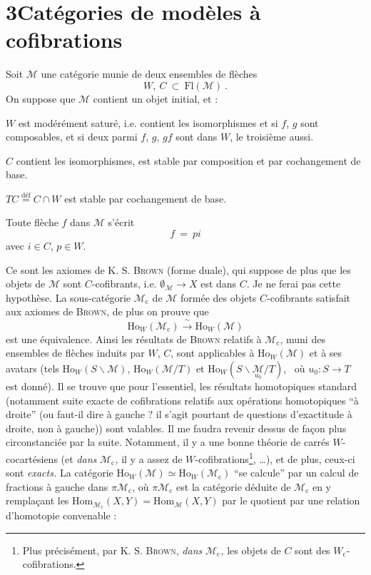 \documentclass[11pt]{article}
\newcommand{\printedpage}[1]{\marginpar{\footnotesize p.~#1\ifstrequal{#1}{1}{\\[2pt]{[page 1]}}{}}}
\newcommand{\msp}[1]{\ifstrequal{#1}{page 1}{}{\marginpar{\footnotesize [#1]}}}
\newcommand{\M}{\mathcal{M}}
\newcommand{\Mc}{\mathcal{M}_{\mathrm{c}}}
\begin{document}
\section*{3\quad Catégories de modèles à cofibrations}

Soit $\M$ une catégorie munie de deux ensembles de flèches
\[ W,\ C\ \subset\ \mathrm{Fl}(\M)\ . \]
On suppose que $\M$ contient un objet initial, et :
\begin{description}[leftmargin=3em, labelwidth=2.5em]
\item[Cof$_0$] $W$ est modérément saturé, i.e. contient les isomorphismes et si $f$, $g$ sont composables, et si deux parmi $f$, $g$, $gf$ sont dans $W$, le troisième aussi.
\item[Cof$_1$] $C$ contient les isomorphismes, est stable par composition et par cochangement de base.
\item[Cof$_2$] $TC \overset{\text{déf}}{=} C \cap W$ est stable par cochangement de base.
\item[Cof$_3$] Toute flèche $f$ dans $\M$ s'écrit
\[ f \ = \ pi \]
avec $i \in C$, $p \in W$.
\end{description}
Ce sont les axiomes de K. S. \textsc{Brown} (forme duale), qui suppose de plus que les objets de $\M$ sont $C$-cofibrants, i.e. $\emptyset_{\M} \longrightarrow X$ est dans $C$. Je ne ferai pas cette hypothèse. La sous-catégorie $\Mc$ de $\M$ formée des \msp{40} objets $C$-cofibrants satisfait aux axiomes de \textsc{Brown}, de plus on prouve que
\[ \mathrm{Ho}_W(\Mc) \xrightarrow{\ \sim\ } \mathrm{Ho}_W(\M) \]
est une équivalence. Ainsi les résultats de \textsc{Brown} relatifs à $\Mc$, muni des ensembles de flèches induits par $W$, $C$, sont applicables à $\mathrm{Ho}_W(\M)$ et à ses avatars (tels $\mathrm{Ho}_W(S\backslash\M)$, $\mathrm{Ho}_W(\M/T)$ et $\mathrm{Ho}_W(S\backslash\underset{u_0}{\M}/T)$, \ où $u_0 : S \longrightarrow T$ est donné). Il se trouve que pour l'essentiel, les résultats homotopiques standard (notamment suite exacte de cofibrations relatifs aux opérations homotopiques “à droite” (ou faut-il dire à gauche ? il s'agit pourtant de questions d'exactitude à droite, non à gauche)) sont valables. Il me faudra revenir dessus de façon plus circonstanciée par la suite. Notamment, il y a une bonne théorie de carrés $W$-cocartésiens (et \textit{dans} $\Mc$\textit{,} il y a assez de $W$-cofibrations\footnote[14]{Plus précisément, par K. S. \textsc{Brown}, \textit{dans} $\Mc$\textit{,} les objets de $C$ sont des $W_{\mathrm{c}}$-cofibrations.}, \ldots),
\printedpage{22}
\msp{41}
et de plus, ceux-ci sont \textit{exacts.} La catégorie $\mathrm{Ho}_W(\M) \simeq \mathrm{Ho}_W(\Mc)$ “se calcule” par un calcul de fractions à gauche dans $\pi\Mc$, où $\pi\Mc$ est la catégorie déduite de $\Mc$ en y remplaçant les $\mathrm{Hom}_{\Mc}(X,Y) = \mathrm{Hom}_{\M}(X,Y)$ par le quotient par une relation d'homotopie convenable :
\end{document}
